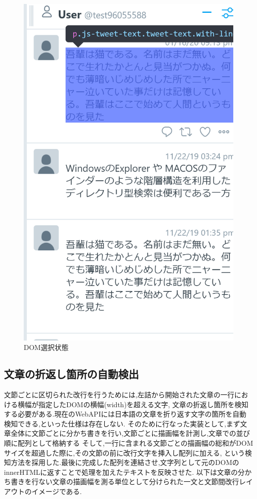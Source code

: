\begin{figure}[H]
    \centering
    \label{fig:image10}
    \includegraphics[width=0.7\columnwidth]{image/03/img1.png}
    \caption[DOM選択状態] {DOM選択状態}
\end{figure}

\subsection{文章の折返し箇所の自動検出}
文節ごとに区切られた改行を行うためには,左詰から開始された文章の一行における横幅が指定したDOMの横幅(width)を超える文字,
文章の折返し箇所を検知する必要がある.現在のWebAPIには日本語の文章を折り返す文字の箇所を自動検知できる,といった仕様は存在しない.
そのために行なった実装として,まず文章全体に文節ごとに分かち書きを行い,文節ごとに描画幅を計測し,文章での並び順に配列として格納する
そして,一行に含まれる文節ごとの描画幅の総和がDOMサイズを超過した際に,その文節の前に改行文字を挿入し配列に加える,
という検知方法を採用した.最後に完成した配列を連結させ,文字列として元のDOMのinnerHTMLに返すことで処理を加えたテキストを反映させた.
以下は文章の分かち書きを行ない文章の描画幅を測る単位として分けられた一文と文節間改行レイアウトのイメージである.

